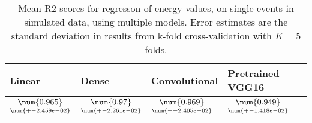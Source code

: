 \begin{table}
\centering
\caption{
Mean R2-scores for regresson of energy values, on single events in simulated data, using multiple models. 
Error estimates are the standard deviation in results from k-fold cross-validation 
with $K=5$ folds.
}
\label{tab:regression-simulated-single-energy-pixelmod-r2}
\begin{tabular}{llll}
\toprule
                                             Linear &                                              Dense &                                       Convolutional &                                    Pretrained VGG16 \\
\midrule
 $\underset{\num{+- 2.459e-02 }  }{\num{ 0.965 } }$ &  $\underset{\num{+- 2.261e-02 }  }{\num{ 0.97 } }$ &  $\underset{\num{+- 2.405e-02 }  }{\num{ 0.969 } }$ &  $\underset{\num{+- 1.418e-02 }  }{\num{ 0.949 } }$ \\
\bottomrule
\end{tabular}
\end{table}
